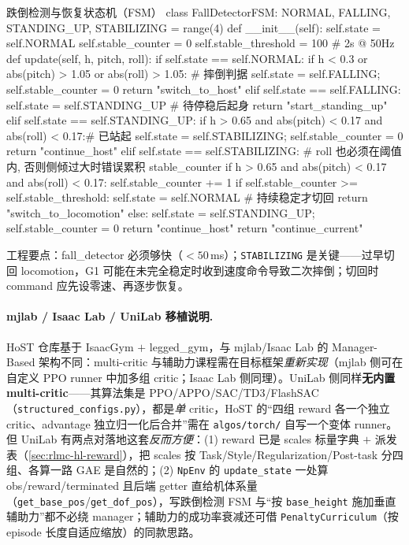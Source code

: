 \begin{codebox}[Python]{跌倒检测与恢复状态机（FSM）}
class FallDetectorFSM:
    NORMAL, FALLING, STANDING_UP, STABILIZING = range(4)
    def __init__(self):
        self.state = self.NORMAL
        self.stable_counter = 0
        self.stable_threshold = 100        # 2s @ 50Hz
    def update(self, h, pitch, roll):
        if self.state == self.NORMAL:
            if h < 0.3 or abs(pitch) > 1.05 or abs(roll) > 1.05:   # 摔倒判据
                self.state = self.FALLING; self.stable_counter = 0
                return "switch_to_host"
        elif self.state == self.FALLING:
            self.state = self.STANDING_UP                          # 待停稳后起身
            return "start_standing_up"
        elif self.state == self.STANDING_UP:
            if h > 0.65 and abs(pitch) < 0.17 and abs(roll) < 0.17:# 已站起
                self.state = self.STABILIZING; self.stable_counter = 0
            return "continue_host"
        elif self.state == self.STABILIZING:
            # roll 也必须在阈值内, 否则侧倾过大时错误累积 stable_counter
            if h > 0.65 and abs(pitch) < 0.17 and abs(roll) < 0.17:
                self.stable_counter += 1
                if self.stable_counter >= self.stable_threshold:
                    self.state = self.NORMAL                       # 持续稳定才切回
                    return "switch_to_locomotion"
            else:
                self.state = self.STANDING_UP; self.stable_counter = 0
            return "continue_host"
        return "continue_current"
\end{codebox}

工程要点：fall\_detector 必须够快（$<50$\,ms）；\texttt{STABILIZING} 是关键——过早切回 locomotion，G1 可能在未完全稳定时收到速度命令导致二次摔倒；切回时 command 应先设零速、再逐步恢复。

\paragraph{mjlab / Isaac Lab / UniLab 移植说明.}
HoST 仓库基于 IsaacGym $+$ legged\_gym，与 mjlab/Isaac Lab 的 Manager-Based 架构不同：multi-critic 与辅助力课程需在目标框架\emph{重新实现}（mjlab 侧可在自定义 PPO runner 中加多组 critic；Isaac Lab 侧同理）。UniLab 侧同样\textbf{无内置 multi-critic}——其算法集是 PPO/APPO/SAC/TD3/FlashSAC（\texttt{structured\_configs.py}），都是\emph{单} critic，HoST 的“四组 reward 各一个独立 critic、advantage 独立归一化后合并”需在 \texttt{algos/torch/} 自写一个变体 runner。但 UniLab 有两点对落地这套\emph{反而方便}：(1) reward 已是 scales 标量字典 $+$ 派发表（\cref{sec:rlmc-hl-reward}），把 scales 按 Task/Style/Regularization/Post-task 分四组、各算一路 GAE 是自然的；(2) \texttt{NpEnv} 的 \texttt{update\_state} 一处算 obs/reward/terminated 且后端 getter 直给机体系量（\texttt{get\_base\_pos}/\texttt{get\_dof\_pos}），写跌倒检测 FSM 与“按 \texttt{base\_height} 施加垂直辅助力”都不必绕 manager；辅助力的成功率衰减还可借 \texttt{PenaltyCurriculum}（按 episode 长度自适应缩放）的同款思路。

